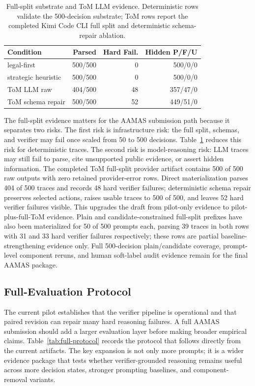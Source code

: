 \documentclass[sigconf,anonymous,review]{acmart}
\begin{document}
\begin{table}[t]
\centering
\caption{Full-split substrate and ToM LLM evidence. Deterministic rows validate the 500-decision substrate; ToM rows report the completed Kimi Code CLI full split and deterministic schema-repair ablation.}
\label{tab:full-baseline}
\scriptsize
\begin{tabular}{lrrr}
\toprule
Condition & Parsed & Hard Fail. & Hidden P/F/U \\
\midrule
legal-first & 500/500 & 0 & 500/0/0 \\
strategic heuristic & 500/500 & 0 & 500/0/0 \\
ToM LLM raw & 404/500 & 48 & 357/47/0 \\
ToM schema repair & 500/500 & 52 & 449/51/0 \\
\bottomrule
\end{tabular}
\end{table}

The full-split evidence matters for the AAMAS submission path because it separates two risks. The first risk is infrastructure risk: the full split, schemas, and verifier may fail once scaled from 50 to 500 decisions. Table~\ref{tab:full-baseline} reduces this risk for deterministic traces. The second risk is model-reasoning risk: LLM traces may still fail to parse, cite unsupported public evidence, or assert hidden information. The completed ToM full-split provider artifact contains 500 of 500 raw outputs with zero retained provider-error rows. Direct materialization parses 404 of 500 traces and records 48 hard verifier failures; deterministic schema repair preserves selected actions, raises usable traces to 500 of 500, and leaves 52 hard verifier failures visible. This upgrades the draft from pilot-only evidence to pilot-plus-full-ToM evidence. Plain and candidate-constrained full-split prefixes have also been materialized for 50 of 500 prompts each, parsing 39 traces in both rows with 31 and 33 hard verifier failures respectively; these rows are partial baseline-strengthening evidence only. Full 500-decision plain/candidate coverage, prompt-level component reruns, and human soft-label audit evidence remain for the final AAMAS package.

\subsection{Full-Evaluation Protocol}

The current pilot establishes that the verifier pipeline is operational and that paired revision can repair many hard reasoning failures. A full AAMAS submission should add a larger evaluation layer before making broader empirical claims. Table~\ref{tab:full-protocol} records the protocol that follows directly from the current artifacts. The key expansion is not only more prompts; it is a wider evidence package that tests whether verifier-grounded reasoning remains useful across more decision states, stronger prompting baselines, and component-removal variants.
\end{document}

